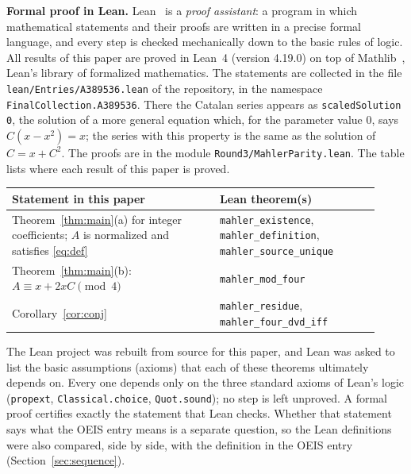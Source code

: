 \documentclass[11pt,a4paper]{article}
\theoremstyle{definition}
\theoremstyle{remark}
\newcommand{\para}[1]{\par\medskip\noindent\textbf{#1}\enspace}
\begin{document}
\para{Formal proof in Lean.}
Lean~\cite{lean} is a \emph{proof assistant}: a program in which mathematical statements and their proofs are written
in a precise formal language, and every step is checked mechanically down to the basic rules of logic. All results of
this paper are proved in Lean~4 (version 4.19.0) on top of Mathlib~\cite{mathlib}, Lean's library of formalized
mathematics. The statements are collected in the file \texttt{lean/Entries/A389536.lean} of the repository,
in the namespace \texttt{FinalCollection.A389536}. There the Catalan series appears as \texttt{scaledSolution 0}, the solution of a more general equation which, for the parameter value $0$, says $C(x-x^2)=x$; the series with this property is the same as the solution of $C=x+C^2$. The proofs are in the module \texttt{Round3/MahlerParity.lean}.
The table lists where each result of this paper is proved.
\begin{center}\small\renewcommand{\arraystretch}{1.25}
\begin{tabular}{>{\raggedright\arraybackslash}p{0.52\linewidth}>{\raggedright\arraybackslash}p{0.4\linewidth}}
\toprule
Statement in this paper & Lean theorem(s)\\
\midrule
Theorem~\ref{thm:main}(a) for integer coefficients; $A$ is normalized and satisfies \eqref{eq:def} & \texttt{mahler\_\allowbreak{}existence}, \texttt{mahler\_\allowbreak{}definition}, \texttt{mahler\_\allowbreak{}source\_\allowbreak{}unique} \\
Theorem~\ref{thm:main}(b): $A\equiv x+2xC\pmod4$ & \texttt{mahler\_\allowbreak{}mod\_\allowbreak{}four} \\
Corollary~\ref{cor:conj} & \texttt{mahler\_\allowbreak{}residue}, \texttt{mahler\_\allowbreak{}four\_\allowbreak{}dvd\_\allowbreak{}iff} \\
\bottomrule
\end{tabular}
\end{center}
The Lean project was rebuilt from source for this paper, and Lean was asked to list the basic assumptions (axioms)
that each of these theorems ultimately depends on. Every one depends only on the three standard axioms of Lean's logic
(\texttt{propext}, \texttt{Classical.choice}, \texttt{Quot.sound}); no step is left unproved. A formal proof certifies
exactly the statement that Lean checks. Whether that statement says what the OEIS entry means is a separate question,
so the Lean definitions were also compared, side by side, with the definition in the OEIS entry
(Section~\ref{sec:sequence}).
\end{document}
